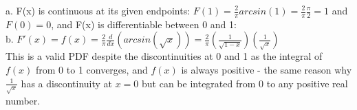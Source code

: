 a.  F(x) is continuous at its given endpoints: \(F(1) = \frac{2}{\pi}arcsin(1) = \frac{2}{\pi}\frac{\pi}{2} = 1\) and \(F(0) = 0\), and F(x) is differentiable between 0 and 1:\\

b. \(F'(x) = f(x) = \frac{2}{\pi}\frac{d}{dx}(arcsin(\sqrt{x})) = \frac{2}{\pi}(\frac{1}{\sqrt{1-x}})(\frac{1}{\sqrt{x}})\)\\

This is a valid PDF despite the discontinuities at 0 and 1 as the integral of \(f(x)\) from 0 to 1 converges, and \(f(x)\) is always positive - the same reason why \(\frac{1}{\sqrt{x}}\) has a discontinuity at \(x=0\) but can be integrated from 0 to any positive real number. 
